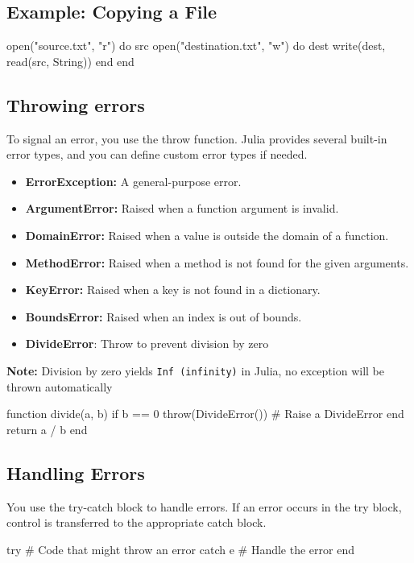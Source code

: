 \documentclass{report}
\begin{document}
     \bigbreak \noindent 
     \subsection{Example: Copying a File }
     \bigbreak \noindent 
     \begin{jlcode}
         open("source.txt", "r") do src
             open("destination.txt", "w") do dest
                 write(dest, read(src, String))
             end
         end
     \end{jlcode}

     \pagebreak 
     \bigbreak \noindent 
     \subsection{Throwing errors}
     \bigbreak \noindent 
     To signal an error, you use the throw function. Julia provides several built-in error types, and you can define custom error types if needed.
     \begin{itemize}
         \item \textbf{ErrorException:} A general-purpose error.
         \item \textbf{ArgumentError:} Raised when a function argument is invalid.
         \item \textbf{DomainError:} Raised when a value is outside the domain of a function.
         \item \textbf{MethodError:} Raised when a method is not found for the given arguments.
         \item \textbf{KeyError:} Raised when a key is not found in a dictionary.
         \item \textbf{BoundsError:} Raised when an index is out of bounds.
         \item \textbf{DivideError}: Throw to prevent division by zero
     \end{itemize}
     \bigbreak \noindent 
     \textbf{Note:} Division by zero yields \texttt{Inf (infinity)} in Julia, no exception will be thrown automatically
     \bigbreak \noindent 
     \begin{jlcode}
         function divide(a, b)
             if b == 0
                 throw(DivideError())  # Raise a DivideError
             end
                 return a / b
         end
     \end{jlcode}

     \bigbreak \noindent 
     \subsection{Handling Errors}
     \bigbreak \noindent 
     You use the try-catch block to handle errors. If an error occurs in the try block, control is transferred to the appropriate catch block.
     \bigbreak \noindent 
     \begin{jlcode}
         try
             # Code that might throw an error
         catch e
             # Handle the error
         end
     \end{jlcode}
\end{document}
